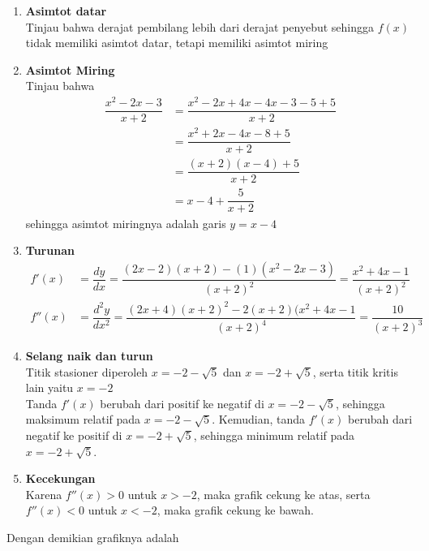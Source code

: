 \documentclass{article}
\begin{document}
\begin{enumerate}
\begin{enumerate}
		\item \textbf{Asimtot datar} \\Tinjau bahwa derajat pembilang lebih dari derajat penyebut sehingga $f(x)$ tidak memiliki asimtot datar, tetapi memiliki asimtot miring
		\item \textbf{Asimtot Miring} \\Tinjau bahwa 
		\begin{align*}
		\dfrac{x^2-2x-3}{x+2} &= \dfrac{x^2-2x+4x-4x-3-5+5}{x+2}\\
		&=\dfrac{x^2+2x-4x-8+5}{x+2}\\
		&=\dfrac{(x+2)(x-4)+5}{x+2}\\
		&= x-4 + \dfrac{5}{x+2}
		\end{align*}
		sehingga asimtot miringnya adalah garis $y=x-4$
		\item \textbf{Turunan} 
		\begin{align*}
		f'(x) &= \dfrac{dy}{dx} = \dfrac{(2x-2)(x+2)-(1)(x^2-2x-3)}{(x+2)^2} = \dfrac{x^2+4x-1}{(x+2)^2} \\
		f''(x) &= \dfrac{d^2y}{dx^2} = \dfrac{(2x+4)(x+2)^2-2(x+2)(x^2+4x-1}{(x+2)^4}= \dfrac{10}{(x+2)^3}
		\end{align*}
		\item \textbf{Selang naik dan turun} \\Titik stasioner diperoleh $x=-2-\sqrt{5}$ dan $x=-2+\sqrt{5}$, serta titik kritis lain yaitu $x=-2$\\
		Tanda $f'(x)$ berubah dari positif ke negatif di $x=-2-\sqrt{5}$, sehingga maksimum relatif pada $x=-2-\sqrt{5}$. Kemudian, tanda $f'(x)$ berubah dari negatif ke positif di $x=-2+\sqrt{5}$, sehingga minimum relatif pada $x=-2+\sqrt{5}$. 
		\item \textbf{Kecekungan} \\Karena $f''(x)>0$ untuk $x>-2$, maka grafik cekung ke atas, serta $f''(x)<0$ untuk $x<-2$, maka grafik cekung ke bawah.
	\end{enumerate}
	Dengan demikian grafiknya adalah 
	\begin{center}
\end{center}
\end{enumerate}
\end{document}
